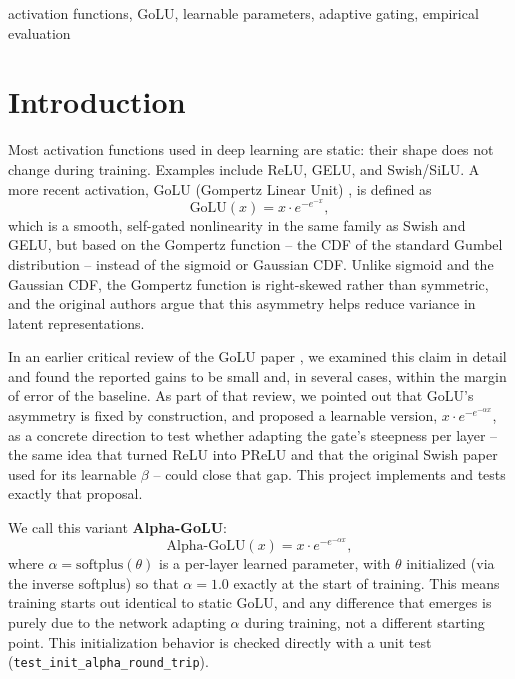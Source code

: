 \documentclass[conference]{IEEEtran}
\begin{document}
\begin{IEEEkeywords}
activation functions, GoLU, learnable parameters, adaptive gating, empirical evaluation
\end{IEEEkeywords}

\section{Introduction}

Most activation functions used in deep learning are static: their shape does not change during training. Examples include ReLU, GELU, and Swish/SiLU. A more recent activation, GoLU (Gompertz Linear Unit) \cite{golu2025}, is defined as
\begin{equation}
\text{GoLU}(x) = x \cdot e^{-e^{-x}},
\end{equation}
which is a smooth, self-gated nonlinearity in the same family as Swish and GELU, but based on the Gompertz function -- the CDF of the standard Gumbel distribution -- instead of the sigmoid or Gaussian CDF. Unlike sigmoid and the Gaussian CDF, the Gompertz function is right-skewed rather than symmetric, and the original authors argue that this asymmetry helps reduce variance in latent representations.

In an earlier critical review of the GoLU paper \cite{kopic2026critical}, we examined this claim in detail and found the reported gains to be small and, in several cases, within the margin of error of the baseline. As part of that review, we pointed out that GoLU's asymmetry is fixed by construction, and proposed a learnable version, $x \cdot e^{-e^{-\alpha x}}$, as a concrete direction to test whether adapting the gate's steepness per layer -- the same idea that turned ReLU into PReLU \cite{prelu2015} and that the original Swish paper used for its learnable $\beta$ \cite{swish2017} -- could close that gap. This project implements and tests exactly that proposal.

We call this variant \textbf{Alpha-GoLU}:
\begin{equation}
\text{Alpha-GoLU}(x) = x \cdot e^{-e^{-\alpha x}},
\end{equation}
where $\alpha = \text{softplus}(\theta)$ is a per-layer learned parameter, with $\theta$ initialized (via the inverse softplus) so that $\alpha = 1.0$ exactly at the start of training. This means training starts out identical to static GoLU, and any difference that emerges is purely due to the network adapting $\alpha$ during training, not a different starting point. This initialization behavior is checked directly with a unit test (\texttt{test\_init\_alpha\_round\_trip}).
\end{document}
